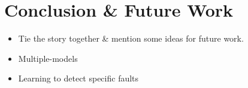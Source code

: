 \documentclass[11pt,a4paper]{article}
\begin{document}
\section{Conclusion \& Future Work}
\label{cha:conclusion}

\begin{itemize}
\item Tie the story together \& mention some ideas for future
  work.
\item Multiple-models
\item Learning to detect specific faults
\end{itemize}



\end{document}
